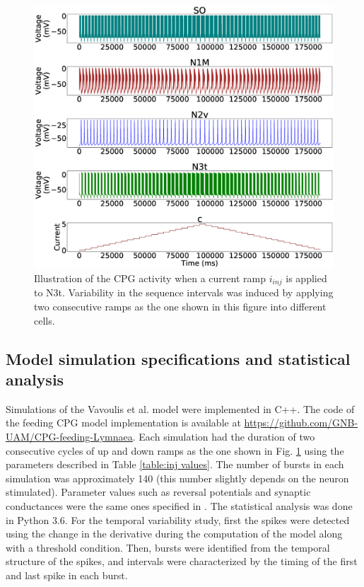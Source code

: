 \begin{figure}[h!]
    \centering
    \includegraphics[width=\textwidth]{img/methods-paper-modelo/figure3.eps}
    \caption{Illustration of the CPG activity when a current ramp \(i_{inj}\) is applied to N3t. Variability in the sequence intervals was induced by applying two consecutive ramps as the one shown in this figure into different cells.  }
    \label{fig:complete ramp example}
\end{figure}


\subsection{Model simulation specifications and statistical analysis}
Simulations of the Vavoulis et al. model \cite{Vavoulis2007} were implemented in C++. The code of the feeding CPG model implementation is available at \url{https://github.com/GNB-UAM/CPG-feeding-Lymnaea}. Each simulation had the duration of two consecutive cycles of up and down ramps as the one shown in Fig. \ref{fig:complete ramp example} using the parameters described in Table \ref{table:inj values}. The number of bursts in each simulation was approximately 140 (this number slightly depends on the neuron stimulated). Parameter values such as reversal potentials and synaptic conductances were the same ones specified in \cite{Vavoulis2007}.
The statistical analysis was done in Python 3.6. For the temporal variability study, first the spikes were detected %
using the change in the derivative during the computation of the model along with a threshold condition. Then, bursts were identified from the temporal structure of the spikes, and intervals were characterized by the timing of the first and last spike in each burst. 

